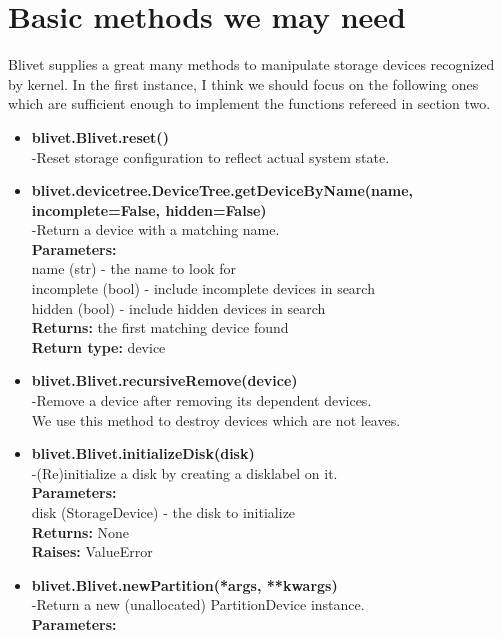 \documentclass{article}
\begin{document}
\section{Basic methods we may need}
Blivet supplies a great many methods to manipulate storage devices recognized
by kernel. In the first instance, I think we should focus on the following ones
which are sufficient enough to implement the functions refereed in section two.
\begin{itemize}
\item \textbf{blivet.Blivet.reset()} \\-Reset storage configuration to reflect
actual system state.\\
\item \textbf{blivet.devicetree.DeviceTree.getDeviceByName(name, incomplete=False, hidden=False)}\\-Return a device
with a matching name.\\
    \textbf{\textbf{Parameters:}}	\\
        name (str) - the name to look for\\
        incomplete (bool) - include incomplete devices in search\\
        hidden (bool) - include hidden devices in search\\
    \textbf{Returns:}	the first matching device found\\
    \textbf{Return type:}	device\\
\item \textbf{blivet.Blivet.recursiveRemove(device)}\\-Remove a device after removing its
dependent devices.\\
We use this method to destroy devices which are not leaves.\\
\item \textbf{blivet.Blivet.initializeDisk(disk)}\\-(Re)initialize a disk by creating a disklabel on it.\\
\textbf{Parameters:}	\\disk (StorageDevice) - the disk to initialize\\
\textbf{Returns:} None\\
\textbf{Raises:}	ValueError\\
\item \textbf{blivet.Blivet.newPartition(*args, **kwargs)}\\-Return a new (unallocated) PartitionDevice
instance.\\
       \textbf{Parameters:}	\\

\end{itemize}
\end{document}
